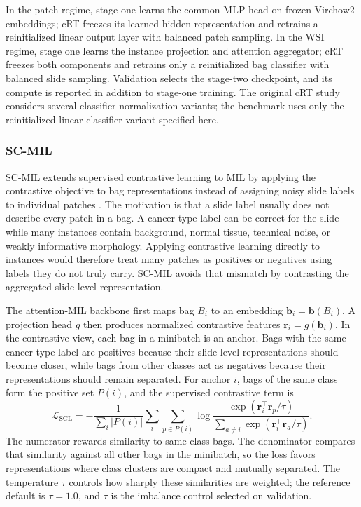 \documentclass[11pt]{article}
\begin{document}
In the patch regime, stage one learns the common MLP head on frozen Virchow2 embeddings; cRT freezes its learned hidden representation and retrains a reinitialized linear output layer with balanced patch sampling. In the WSI regime, stage one learns the instance projection and attention aggregator; cRT freezes both components and retrains only a reinitialized bag classifier with balanced slide sampling. Validation selects the stage-two checkpoint, and its compute is reported in addition to stage-one training. The original cRT study considers several classifier normalization variants; the benchmark uses only the reinitialized linear-classifier variant specified here.

\subsubsection{SC-MIL}
SC-MIL extends supervised contrastive learning to MIL by applying the contrastive objective to bag representations instead of assigning noisy slide labels to individual patches \citep{juyal2024scMil}. The motivation is that a slide label usually does not describe every patch in a bag. A cancer-type label can be correct for the slide while many instances contain background, normal tissue, technical noise, or weakly informative morphology. Applying contrastive learning directly to instances would therefore treat many patches as positives or negatives using labels they do not truly carry. SC-MIL avoids that mismatch by contrasting the aggregated slide-level representation.

The attention-MIL backbone first maps bag $B_i$ to an embedding $\mathbf{b}_i=\mathbf{b}(B_i)$. A projection head $g$ then produces normalized contrastive features $\mathbf{r}_i=g(\mathbf{b}_i)$. In the contrastive view, each bag in a minibatch is an anchor. Bags with the same cancer-type label are positives because their slide-level representations should become closer, while bags from other classes act as negatives because their representations should remain separated. For anchor $i$, bags of the same class form the positive set $P(i)$, and the supervised contrastive term is
\begin{equation}
  \mathcal{L}_{\mathrm{SCL}} =
  -\frac{1}{\sum_i |P(i)|}
  \sum_i \sum_{p\in P(i)}
  \log
  \frac{\exp(\mathbf{r}_i^\top\mathbf{r}_p/\tau)}
       {\sum_{a\ne i}\exp(\mathbf{r}_i^\top\mathbf{r}_a/\tau)}.
  \label{eq:scl}
\end{equation}
\noindent The numerator rewards similarity to same-class bags. The denominator compares that similarity against all other bags in the minibatch, so the loss favors representations where class clusters are compact and mutually separated. The temperature $\tau$ controls how sharply these similarities are weighted; the reference default is $\tau=\num{1.0}$, and $\tau$ is the imbalance control selected on validation.
\end{document}

